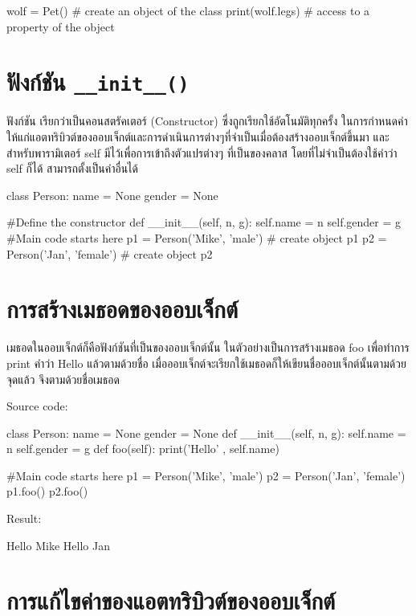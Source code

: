 \begin{pycode}
wolf = Pet() # create an object of the class
print(wolf.legs) # access to a property of the object
\end{pycode}


\section{ฟังก์ชัน \texttt{\_\_init\_\_()}}

ฟังก์ชัน  เรียกว่าเป็นคอนสตรัคเตอร์  (Constructor) ซึ่งถูกเรียกใช้อัตโนมัติทุกครั้ง ในการกำหนดค่าให้แก่แอตทริบิวต์ของออบเจ็กต์และการดำเนินการต่างๆที่จำเป็นเมื่อต้องสร้างออบเจ็กต์ขึ้นมา และสำหรับพารามิเตอร์ self มีไว้เพื่อการเข้าถึงตัวแปรต่างๆ ที่เป็นของคลาส โดยที่ไม่จำเป็นต้องใช้คำว่า self ก็ได้ สามารถตั้งเป็นคำอื่นได้

\begin{pycode}
class Person:
    name = None
    gender = None
    
    #Define the constructor
    def __init__(self, n, g):
        self.name = n
        self.gender = g
#Main code starts here
p1 = Person('Mike', 'male') # create object p1
p2 = Person('Jan', 'female') # create object p2
\end{pycode}


\section{การสร้างเมธอดของออบเจ็กต์}

เมธอดในออบเจ็กต์ก็คือฟังก์ชันที่เป็นของออบเจ็กต์นั้น ในตัวอย่างเป็นการสร้างเมธอด foo เพื่อทำการ print คำว่า Hello แล้วตามด้วยชื่อ เมื่อออบเจ็กต์จะเรียกใช้เมธอดก็ให้เขียนชื่อออบเจ็กต์นั้นตามด้วยจุดแล้ว จึงตามด้วยชื่อเมธอด

Source code:
\begin{pycode}
class Person:
    name = None
    gender = None
    def __init__(self, n, g):
        self.name = n
        self.gender = g
    def foo(self):
        print('Hello' , self.name)

#Main code starts here
p1 = Person('Mike', 'male')
p2 = Person('Jan', 'female')
p1.foo()
p2.foo()
\end{pycode}

Result:
\begin{pycode}
Hello Mike
Hello Jan
\end{pycode}


\section{การแก้ไขค่าของแอตทริบิวต์ของออบเจ็กต์}

